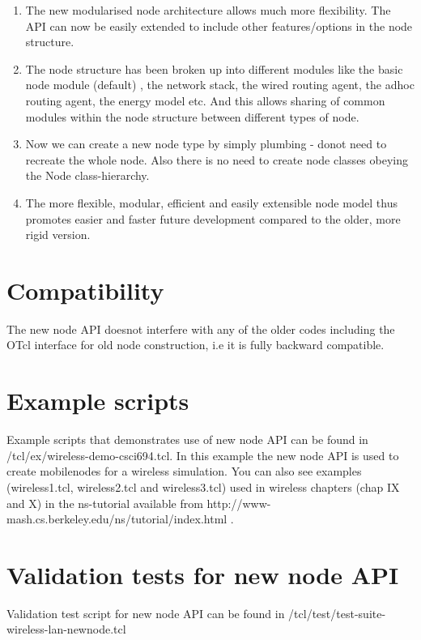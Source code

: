 \begin{enumerate}
\item
The new modularised node architecture allows much more flexibility.
The API can now be easily extended to include other features/options in the
node structure. 
\item
The node structure has been broken up into different modules like the
basic node module (default) , the network stack, the wired routing
agent, the adhoc routing agent, the energy model etc. And this allows
sharing of common modules within the node structure between different
types of node.
\item
Now we can create a new node type by simply plumbing - donot need to
recreate the whole node. Also there is no need to create node classes
obeying the Node class-hierarchy. 
\item
The more flexible, modular, efficient and easily extensible node model
thus promotes easier and faster future development compared to the older,
more rigid version.
\end{enumerate}


\section{Compatibility}
\label{sec:compat}

The new node API doesnot interfere with any of the older codes including
the OTcl interface for old node construction, i.e it is fully backward
compatible.


\section{Example scripts}
\label{sec:ex}

Example scripts that demonstrates use of new node API can be found in
\ns/tcl/ex/wireless-demo-csci694.tcl. In this example the new node API is
used to create mobilenodes for a  wireless simulation. You can also see
examples (wireless1.tcl, wireless2.tcl and wireless3.tcl) used in wireless
chapters (chap IX and X) in the ns-tutorial available from 
http://www-mash.cs.berkeley.edu/ns/tutorial/index.html .


\section{Validation tests for new node API}
\label{sec:valid-test}

Validation test script for new node API can be found in
\ns/tcl/test/test-suite-wireless-lan-newnode.tcl 


